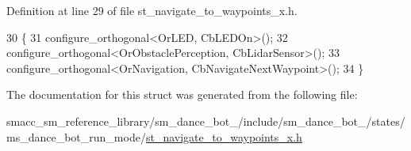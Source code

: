 Definition at line 29 of file st\+\_\+navigate\+\_\+to\+\_\+waypoints\+\_\+x.\+h.


\begin{DoxyCode}
30   \{
31     configure\_orthogonal<OrLED, CbLEDOn>();
32     configure\_orthogonal<OrObstaclePerception, CbLidarSensor>();
33     configure\_orthogonal<OrNavigation, CbNavigateNextWaypoint>();
34   \}
\end{DoxyCode}


The documentation for this struct was generated from the following file\+:\begin{DoxyCompactItemize}
\item 
smacc\+\_\+sm\+\_\+reference\+\_\+library/sm\+\_\+dance\+\_\+bot\+\_/include/sm\+\_\+dance\+\_\+bot\+\_/states/ms\+\_\+dance\+\_\+bot\+\_\+run\+\_\+mode/\hyperlink{sm__dance__bot__2_2include_2sm__dance__bot__2_2states_2ms__dance__bot__run__mode_2st__navigate__to__waypoints__x_8h}{st\+\_\+navigate\+\_\+to\+\_\+waypoints\+\_\+x.\+h}\end{DoxyCompactItemize}

